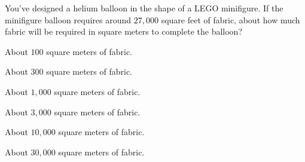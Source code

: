 \documentclass[12pt,noauthor,nooutcomes]{ximera}
\begin{document}
\begin{exercise}
You've designed a helium balloon in the shape of a LEGO minifigure. If
the minifigure balloon requires around $27,000$ square feet of fabric,
about how much fabric will be required in square meters to complete
the balloon?
\begin{enumerate}\begin{multicols}{2}
  \item About $100$ square meters of fabric.
  \item About $300$ square meters of fabric.
  \item About $1,000$ square meters of fabric.
  \item About $3,000$ square meters of fabric.
  \item About $10,000$ square meters of fabric.
  \item About $30,000$ square meters of fabric.
  \end{multicols}
\end{enumerate}
\end{exercise}






\end{document}
